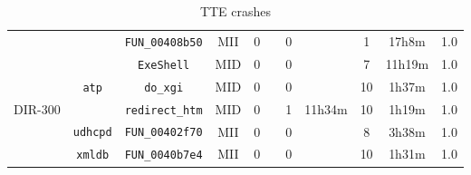 \begin{table}[ht]
\begin{tabular}{|l||c|c|c|c|c|c|c|c|c|c|}
\cline{3-11}
 &  & \texttt{FUN\_00408b50} & MII & 0 &  & 0 &  & 1 & 17h8m & 1.0 \\
\cline{3-11}
\cline{2-11}
\cline{1-1}
\multirow{5}{*}{DIR-300} & \multirow{3}{*}{\texttt{atp}} & \texttt{ExeShell} & MID & 0 &  & 0 &  & 7 & 11h19m & 1.0 \\
\cline{3-11}
 &  & \texttt{do\_xgi} & MID & 0 &  & 0 &  & 10 & 1h37m & 1.0 \\
\cline{3-11}
 &  & \texttt{redirect\_htm} & MID & 0 &  & 1 & 11h34m & 10 & 1h19m & 1.0 \\
\cline{3-11}
\cline{2-11}
 & \multirow{1}{*}{\texttt{udhcpd}} & \texttt{FUN\_00402f70} & MII & 0 &  & 0 &  & 8 & 3h38m & 1.0 \\
\cline{3-11}
\cline{2-11}
 & \multirow{1}{*}{\texttt{xmldb}} & \texttt{FUN\_0040b7e4} & MII & 0 &  & 0 &  & 10 & 1h31m & 1.0 \\
\cline{3-11}
\cline{2-11}
\cline{1-1}
\hline
\end{tabular}
\caption{TTE crashes}
\end{table}

